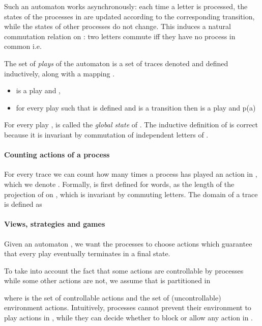 \documentclass[a4paper,UKenglish]{lipics-v2016}
\DeclareMathOperator{\dom}{dom}
\begin{document}
Such an automaton works asynchronously:
each time a letter  is processed, the states of the processes
in  are updated according to the corresponding
transition, while the states of other processes do not change.
This induces a natural commutation relation  on :
two letters commute iff they have no process in common i.e.


The set of \emph{plays} of the automaton 
is a set of traces denoted  and defined inductively, along with 
a mapping .
\begin{itemize}
\item  is a play and ,
\item for every play  such that  is defined
and 
is a transition then
 is a play and
p\not\in\dom(a)
\end{itemize}

For every play ,  is called the \emph{global state} of .
The inductive definition of  is correct because it is invariant by
commutation of independent letters of .


\paragraph*{Counting actions of a process}
For every trace  we can count how many times a process 
has played an action in , which we denote .
Formally,  is first defined for words, as the length of the projection
of  on , which is invariant by commuting letters.
The domain of a trace is defined as 


\paragraph*{Views, strategies and games}

Given an automaton ,
we want the processes to choose actions
which guarantee that
every play eventually terminates in a final state.

To take into account the fact that some actions are controllable by processes while some other actions are not, we assume that  is partitioned in 

where  is the set of controllable actions and
 the set of (uncontrollable)  environment actions.
Intuitively, processes cannot prevent their environment to 
play actions in , while they can decide whether to block or allow any action in .
\end{document}
